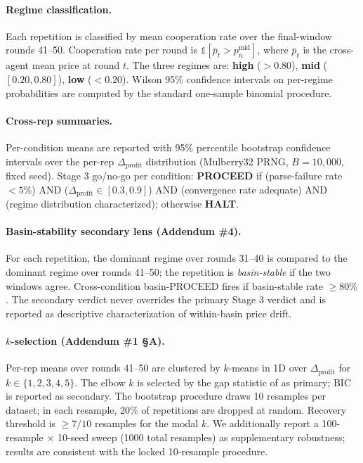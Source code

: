 \paragraph{Regime classification.}
Each repetition is classified by mean cooperation rate over the final-window rounds 41--50. Cooperation rate per round is $\mathbb{1}[\bar{p}_t > p^{\text{mid}}_n]$, where $\bar{p}_t$ is the cross-agent mean price at round $t$. The three regimes are: \textbf{high} ($> 0.80$), \textbf{mid} ($[0.20, 0.80]$), \textbf{low} ($< 0.20$). Wilson 95\% confidence intervals on per-regime probabilities are computed by the standard one-sample binomial procedure.

\paragraph{Cross-rep summaries.}
Per-condition means are reported with 95\% percentile bootstrap confidence intervals over the per-rep $\Delta_{\text{profit}}$ distribution (Mulberry32 PRNG, $B = 10{,}000$, fixed seed). Stage 3 go/no-go per condition: \textbf{PROCEED} if (parse-failure rate $< 5\%$) AND ($\Delta_{\text{profit}} \in [0.3, 0.9]$) AND (convergence rate adequate) AND (regime distribution characterized); otherwise \textbf{HALT}.

\paragraph{Basin-stability secondary lens (Addendum \#4).}
For each repetition, the dominant regime over rounds 31--40 is compared to the dominant regime over rounds 41--50; the repetition is \emph{basin-stable} if the two windows agree. Cross-condition basin-PROCEED fires if basin-stable rate $\geq 80\%$. The secondary verdict never overrides the primary Stage 3 verdict and is reported as descriptive characterization of within-basin price drift.

\paragraph{$k$-selection (Addendum \#1 \S A).}
Per-rep means over rounds 41--50 are clustered by $k$-means in 1D over $\Delta_{\text{profit}}$ for $k \in \{1, 2, 3, 4, 5\}$. The elbow $k$ is selected by the gap statistic of \citet{tibshirani_walther_hastie_2001_gap_statistic} as primary; BIC is reported as secondary. The bootstrap procedure draws 10 resamples per dataset; in each resample, 20\% of repetitions are dropped at random. Recovery threshold is $\geq 7/10$ resamples for the modal $k$. We additionally report a 100-resample $\times$ 10-seed sweep (1000 total resamples) as supplementary robustness; results are consistent with the locked 10-resample procedure.

